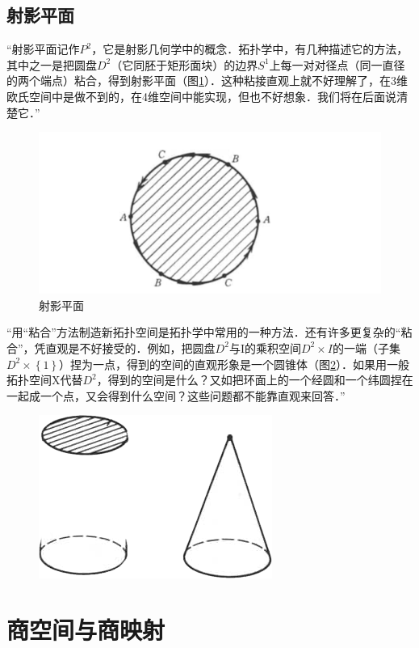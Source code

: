 \subsection*{射影平面}
“射影平面记作\(P^2\)，它是射影几何学中的概念．拓扑学中，有几种描述它的方法，其中之一是把圆盘\(D^2\)（它同胚于矩形面块）的边界\(S^1\)上每一对对径点（同一直径的两个端点）粘合，得到射影平面（图\ref{fig:enter-label_6}）．这种粘接直观上就不好理解了，在3维欧氏空间中是做不到的，在4维空间中能实现，但也不好想象．我们将在后面说清楚它．”
\begin{figure}[H]
    \centering
    \includegraphics[width=0.5\linewidth]{image_6.png}
    \caption{射影平面}
    \label{fig:enter-label_6}
\end{figure}
“用“粘合”方法制造新拓扑空间是拓扑学中常用的一种方法．还有许多更复杂的“粘合”，凭直观是不好接受的．例如，把圆盘\(D^2\)与I的乘积空间\(D^2 \times I \)的一端（子集\(D^2 \times \left\{1\right\}\)）捏为一点，得到的空间的直观形象是一个圆锥体（图\ref{fig:enter-label_7}）．如果用一般拓扑空间X代替\(D^2\)，得到的空间是什么？又如把环面上的一个经圆和一个纬圆捏在一起成一个点，又会得到什么空间？这些问题都不能靠直观来回答．”
\begin{figure}[H]
    \centering
    \includegraphics[width=0.5\linewidth]{image_7.png}
    \caption{}
    \label{fig:enter-label_7}
\end{figure}
\section{商空间与商映射}
